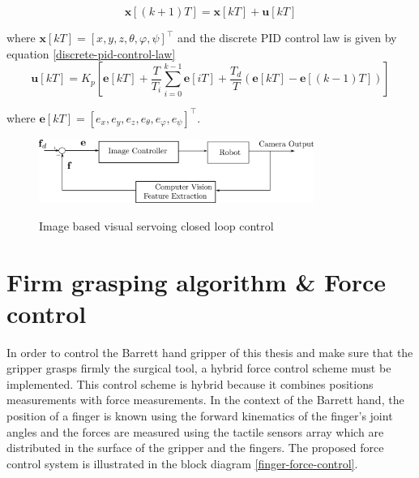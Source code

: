 \begin{equation}
\mathbf{x}[(k+1)T] = \mathbf{x}[kT] + \mathbf{u}[kT]
\end{equation}

where $\mathbf{x}[kT] = [x, y, z, θ, φ, ψ]^\top$ and the discrete PID control law is given by equation \ref{discrete-pid-control-law}
\begin{equation}
\label{discrete-pid-control-law}
\mathbf{u}[kT] = K_p \left[ \mathbf{e}[kT] + \frac{T}{T_i} \sum_{i=0}^{k-1} \mathbf{e}[iT] + \frac{T_d}{T} \left( \mathbf{e}[kT] - \mathbf{e}[(k-1)T] \right) \right]
\end{equation}

where $\mathbf{e}[kT] = [e_x, e_y, e_z, e_θ, e_φ, e_ψ]^\top$.

\begin{center}
\begin{figure}[!htb]
\centering
\includegraphics[width=0.8\textwidth]{images/visual-servoing-image-based.png}\\
\caption{Image based visual servoing closed loop control}
\label{visual-servoing-image-based-control}
\end{figure}
\end{center}


\section{Firm grasping algorithm \& Force control}

In order to control the Barrett hand gripper of this thesis and make sure that the gripper grasps firmly the surgical tool, a hybrid force control scheme must be implemented. This control scheme is hybrid because it 
combines positions measurements with force measurements. In the context of the Barrett hand, the position of a finger is known using the forward kinematics of the finger's joint angles and the forces are measured using 
the tactile sensors array which are distributed in the surface of the gripper and the fingers. The proposed force control system is illustrated in the block diagram \ref{finger-force-control}.

